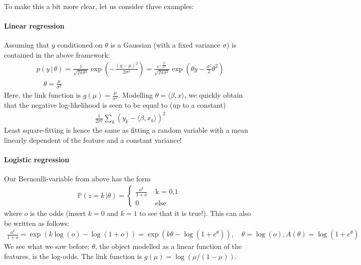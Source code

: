 \documentclass{article}
\newcommand{\sprod}[1]{\langle #1 \rangle}
\begin{document}
To make this a bit more clear, let us consider three examples:

\paragraph{Linear regression} Assuming that $y$ conditioned on $\theta$ is a Gaussian (with a fixed variance $\sigma$) is contained in the above framework:
\begin{align*}
    p(y \, \vert \, \theta) = \frac{1}{\sqrt{2\pi\sigma^2}} \exp\left(-\frac{(y-\mu)^2}{2\sigma^2}\right) = \frac{e^{-\tfrac{y^2}{2\sigma^2}}}{\sqrt{2\pi\sigma^2}}\exp (\theta y - \tfrac{\sigma^2}{2}\theta^2) \\ \quad \theta = \frac{\mu}{\sigma^2}
\end{align*}
Here, the link function is $g(\mu) =\frac{\mu}{\sigma^2}$. Modelling $\theta = \sprod{\beta,x}$, we quickly obtain that the negative log-likelihood is seen to be equal to (up to a constant)
\begin{align*}
    \tfrac{1}{2\sigma^2} \sum_{k}(y_k-\sprod{\beta,x_k})^2
\end{align*}
Least square-fitting is hence the same as fitting a random variable with a mean linearly dependent of the feature and a constant variance!

\paragraph{Logistic regression} Our Bernoulli-variable from above has the form
\begin{align*}
      \mathbb{P}(z=k \, \vert \theta) = \begin{cases} \frac{o^k}{1+o} & \text{ k = 0,1 } \\ 0 & \text{ else} \end{cases}
\end{align*}
where $o$ is the odds (insert $k=0$ and $k=1$ to see that it is true!). This can also be written as follows:
\begin{align*}
    \frac{o^k}{1+o} = \exp(k\log(o)-\log(1+o)) = \exp(k\theta - \log(1+e^\theta)), \quad \theta =\log(o), A(\theta) = \log(1+e^\theta)
\end{align*}
We see what we saw before: $\theta$, the object modelled as a linear function of the features, is the log-odds. The link function is $g(\mu) = \log(\mu/(1-\mu))$.
\end{document}
